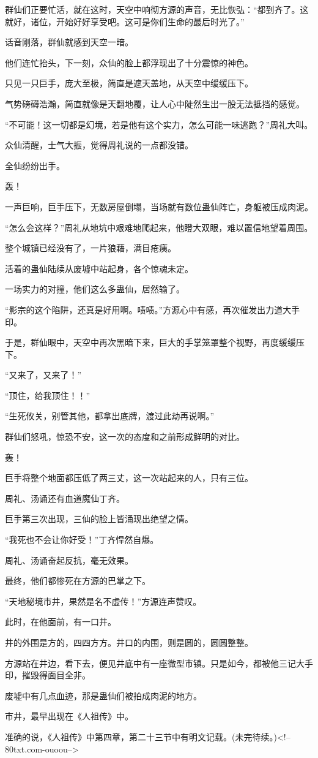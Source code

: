 \begin{this_body}
群仙们正要忙活，就在这时，天空中响彻方源的声音，无比恢弘：“都到齐了。这就好，诸位，开始好好享受吧。这可是你们生命的最后时光了。”

话音刚落，群仙就感到天空一暗。

他们连忙抬头，下一刻，众仙的脸上都浮现出了十分震惊的神色。

只见一只巨手，庞大至极，简直是遮天盖地，从天空中缓缓压下。

气势磅礴浩瀚，简直就像是天翻地覆，让人心中陡然生出一股无法抵挡的感觉。

“不可能！这一切都是幻境，若是他有这个实力，怎么可能一味逃跑？”周礼大叫。

众仙清醒，士气大振，觉得周礼说的一点都没错。

全仙纷纷出手。

轰！

一声巨响，巨手压下，无数房屋倒塌，当场就有数位蛊仙阵亡，身躯被压成肉泥。

“怎么会这样？”周礼从地坑中艰难地爬起来，他瞪大双眼，难以置信地望着周围。

整个城镇已经没有了，一片狼藉，满目疮痍。

活着的蛊仙陆续从废墟中站起身，各个惊魂未定。

一场实力的对撞，他们这么多蛊仙，居然输了。

“影宗的这个陷阱，还真是好用啊。啧啧。”方源心中有感，再次催发出力道大手印。

于是，群仙眼中，天空中再次黑暗下来，巨大的手掌笼罩整个视野，再度缓缓压下。

“又来了，又来了！”

“顶住，给我顶住！！”

“生死攸关，别管其他，都拿出底牌，渡过此劫再说啊。”

群仙们怒吼，惊恐不安，这一次的态度和之前形成鲜明的对比。

轰！

巨手将整个地面都压低了两三丈，这一次站起来的人，只有三位。

周礼、汤诵还有血道魔仙丁齐。

巨手第三次出现，三仙的脸上皆涌现出绝望之情。

“我死也不会让你好受！”丁齐悍然自爆。

周礼、汤诵奋起反抗，毫无效果。

最终，他们都惨死在方源的巴掌之下。

“天地秘境市井，果然是名不虚传！”方源连声赞叹。

此时，在他面前，有一口井。

井的外围是方的，四四方方。井口的内围，则是圆的，圆圆整整。

方源站在井边，看下去，便见井底中有一座微型市镇。只是如今，都被他三记大手印，摧毁得面目全非。

废墟中有几点血迹，那是蛊仙们被拍成肉泥的地方。

市井，最早出现在《人祖传》中。

准确的说，《人祖传》中第四章，第二十三节中有明文记载。(未完待续。)<!--80txt.com-ouoou-->

\end{this_body}

